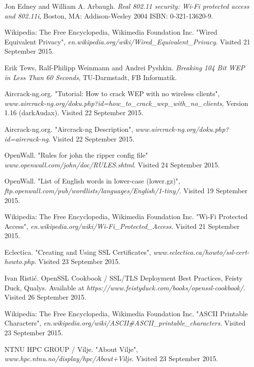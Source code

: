 \documentclass[a4paper,11pt]{article}
\begin{document}
\begin{thebibliography}{9}

Jon Edney and William A. Arbaugh.
\emph{Real 802.11 security: Wi-Fi protected access and 802.11i},
Boston, MA: Addison-Wesley 2004 ISBN: 0-321-13620-9.

Wikipedia: The Free Encyclopedia, Wikimedia Foundation Inc.
"Wired Equivalent Privacy",
\emph{en.wikipedia.org/wiki/Wired\_Equivalent\_Privacy}.
Visited 21 September 2015.
  
Erik Tews, Ralf-Philipp Weinmann and Andrei Pyshkin.
\emph{Breaking 104 Bit WEP in Less Than 60 Seconds},
TU-Darmstadt, FB Informatik.
  
Aircrack-ng.org.
"Tutorial: How to crack WEP with no wireless clients",
\emph{www.aircrack-ng.org/doku.php?id=how\_to\_crack\_wep\_with\_no\_clients},
Version 1.16 (darkAudax).
Visited 22 September 2015.

Aircrack-ng.org.
"Aircrack-ng Description",
\emph{www.aircrack-ng.org/doku.php?id=aircrack-ng}.
Visited 22 September 2015.

OpenWall.
"Rules for john the ripper config file"
\emph{www.openwall.com/john/doc/RULES.shtml}.
Visited 24 September 2015.

OpenWall.
"List of English words in lower-case (lower.gz)",
\emph{ftp.openwall.com/pub/wordlists/languages/English/1-tiny/}.
Visited 19 September 2015.

Wikipedia: The Free Encyclopedia, Wikimedia Foundation Inc.
"Wi-Fi Protected Access",
\emph{en.wikipedia.org/wiki/Wi-Fi\_Protected\_Access}.
Visited 21 September 2015.

Eclectica.
"Creating and Using SSL Certificates",
\emph{www.eclectica.ca/howto/ssl-cert-howto.php}.
Visited 23 September 2015.

Ivan Ristić.
OpenSSL Cookbook / SSL/TLS Deployment Best Practices,
Feisty Duck, Qualys.
Available at \emph{https://www.feistyduck.com/books/openssl-cookbook/}.
Visited 26 September 2015.

Wikipedia: The Free Encyclopedia, Wikimedia Foundation Inc.
"ASCII Printable Characters",
\emph{en.wikipedia.org/wiki/ASCII\#ASCII\_printable\_characters}.
Visited 23 September 2015.

NTNU HPC GROUP / Vilje.
"About Vilje",
\emph{www.hpc.ntnu.no/display/hpc/About+Vilje}.
Visited 23 September 2015.


\end{thebibliography}
\end{document}

